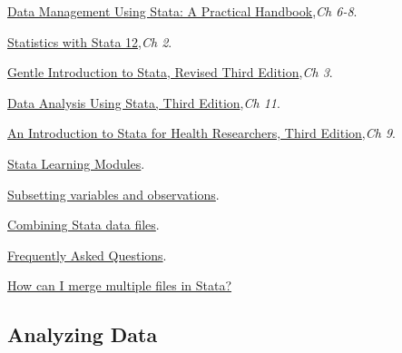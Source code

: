 \documentclass{article}
\begin{document}
\begin{compactitem}
\item \href{http://www.stata-press.com/books/data-management-using-stata/}{Data Management Using Stata: A Practical Handbook},\textit{Ch 6-8}.
\item \href{http://www.stata.com/bookstore/statistics-with-stata/}{Statistics with Stata 12},\textit{Ch 2}.
\item \href{http://statapress.com/books/gentle-introduction-to-stata/}{Gentle Introduction to Stata, Revised Third Edition},\textit{Ch 3}.
\item \href{http://statapress.com/books/data-analysis-using-stata/}{Data Analysis Using Stata, Third Edition},\textit{Ch 11}.
\item \href{http://statapress.com/books/introduction-stata-health-researchers/}{An Introduction to Stata for Health Researchers, Third Edition},\textit{Ch 9}.

\item \href{http://www.ats.ucla.edu/stat/stata/modules/}{Stata Learning Modules}.
\begin{compactitem}
\item \href{http://www.ats.ucla.edu/stat/stata/modules/subset.htm}{Subsetting variables and observations}.
\item \href{http://www.ats.ucla.edu/stat/stata/modules/combine.htm}{Combining Stata data files}.
\end{compactitem}

\item \href{http://www.ats.ucla.edu/stat/stata/faq/default.htm}{Frequently Asked Questions}.

\begin{compactitem}
\item \href{http://www.ats.ucla.edu/stat/stata/faq/multmerge.htm}{How can I merge multiple files in Stata?}
\end{compactitem}

\end{compactitem}

\subsection{Analyzing Data}
\end{document}
